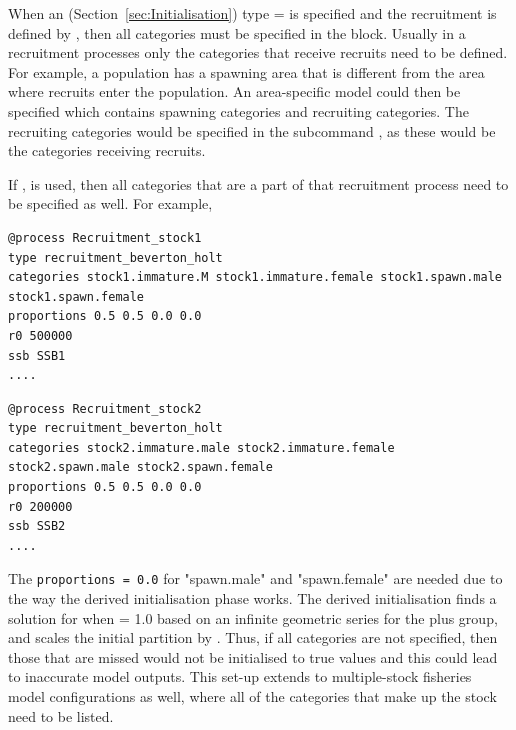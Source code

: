 When an  (Section~\ref{sec:Initialisation}) type =  is specified and the recruitment is defined by , then all categories must be specified in the  block. Usually in a recruitment processes only the categories that receive recruits need to be defined. For example, a population has a spawning area that is different from the area where recruits enter the population. An area-specific model could then be specified which contains spawning categories and recruiting categories. The recruiting categories would be specified in the subcommand , as these would be the categories receiving recruits.

If ,  is used, then all categories that are a part of that recruitment process need to be specified as well. For example,

{\small{\begin{verbatim}
@process Recruitment_stock1
type recruitment_beverton_holt
categories stock1.immature.M stock1.immature.female stock1.spawn.male stock1.spawn.female
proportions 0.5 0.5 0.0 0.0
r0 500000
ssb SSB1
....
\end{verbatim}}}

{\small{\begin{verbatim}
@process Recruitment_stock2
type recruitment_beverton_holt
categories stock2.immature.male stock2.immature.female stock2.spawn.male stock2.spawn.female
proportions 0.5 0.5 0.0 0.0
r0 200000
ssb SSB2
....
\end{verbatim}}}

The \texttt{proportions = 0.0} for "spawn.male" and "spawn.female" are needed due to the way the derived initialisation phase works. The derived initialisation finds a solution for when  = 1.0 based on an infinite geometric series for the plus group, and scales the initial partition by . Thus, if all categories are not specified, then those that are missed would not be initialised to true values and this could lead to inaccurate model outputs. This set-up extends to multiple-stock fisheries model configurations as well, where all of the categories that make up the stock need to be listed.

\subsubsection{\label{sec:Process-Ageing}}

